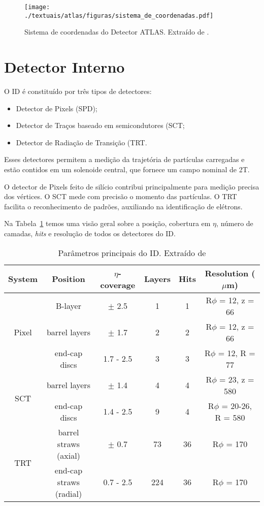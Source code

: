 \begin{figure}[h!]
	\centering
	\texttt{[image: ./textuais/atlas/figuras/sistema\_de\_coordenadas.pdf]}\\
	\caption{Sistema de coordenadas do Detector ATLAS. Extraído de \cite{dos2006sistema}.}
	\label{fig:3T17}
\end{figure}

\section{Detector Interno}

O \ac{ID} \cite{atlasatlas} é constituído por três tipos de detectores:

\begin{itemize}
\item Detector de Pixels  (\ac{SPD});
\item Detector de Traços baseado em semicondutores (\ac{SCT};
\item Detector de Radiação de Transição (\ac{TRT}.
\end{itemize}

	Esses detectores permitem a medição da trajetória de partículas carregadas e estão contidos em um solenoide central, que fornece um campo nominal de 2T.

	O detector de Pixels feito de silício contribui principalmente para medição precisa dos vértices. O \ac{SCT}  mede com precisão o momento das partículas. O TRT facilita o reconhecimento de padrões, auxiliando na identificação de elétrons.

Na Tabela~\ref{tab:01} temos uma visão geral sobre a posição, cobertura em $\eta$, número de camadas, \emph{hits} e resolução de todos os detectores do ID.

\begin{table}
  \centering
  \caption{Parâmetros principais do ID. Extraído de \cite{peeters2003atlas}}\label{tab:01}
  \begin{tabular}{|c|c|c|c|c|c|}
    \hline
    System	&	Position	&	$\eta$-coverage	&	Layers	&	Hits	&	Resolution ($\mu$m)	\\ 	\hline	\hline
\multirow{3}{*}{Pixel}	&	B-layer	&	$\pm$ 2.5	&	1	&	1	&	R$\phi$ = 12, z = 66	\\ 	
	&	barrel layers	&	$\pm$ 1.7	&	2	&	2	&	R$\phi$ = 12, z = 66	\\ 		
	&	end-cap discs	&	1.7 - 2.5	&	3	&	3	&	R$\phi$ = 12, R = 77	\\ 	\hline	
\multirow{2}{*}{SCT}	&	barrel layers	&	$\pm$ 1.4	&	4	&	4	&	R$\phi$ = 23, z = 580	\\ 		
	&	end-cap discs	&	1.4 - 2.5	&	9	&	4	&	R$\phi$ = 20-26, R = 580	\\ \hline 		
\multirow{2}{*}{TRT}	&	barrel straws (axial)	&	$\pm$ 0.7	&	73	&	36	&	R$\phi$ = 170	\\ 		
	&	end-cap straws (radial)	&	0.7 - 2.5	&	224	&	36	&	R$\phi$ = 170	\\ 		

    \hline
  \end{tabular}
\end{table}


